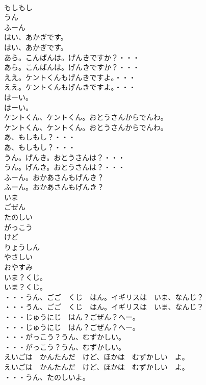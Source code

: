 \documentclass[8pt]{extreport}
\begin{document}
\begin{CJK}{UTF8}{min}
\\	もしもし
\\	うん
\\	ふーん
\\	はい、あかぎです。	
\\	はい、あかぎです。 
\\	あら。こんばんは。げんきですか？・・・	
\\	あら。こんばんは。げんきですか？・・・ 
\\	ええ。ケントくんもげんきですよ。・・・	
\\	ええ。ケントくんもげんきですよ。・・・ 
\\	はーい。	
\\	はーい。 
\\	ケントくん、ケントくん。おとうさんからでんわ。	
\\	ケントくん、ケントくん。おとうさんからでんわ。 
\\	あ、もしもし？・・・	
\\	あ、もしもし？・・・ 
\\	うん。げんき。おとうさんは？・・・	
\\	うん。げんき。おとうさんは？・・・ 
\\	ふーん。おかあさんもげんき？	
\\	ふーん。おかあさんもげんき？ 
\\	いま
\\	ごぜん
\\	たのしい
\\	がっこう
\\	けど
\\	りょうしん
\\	やさしい
\\	おやすみ
\\	いま？くじ。	
\\	いま？くじ。 
\\	・・・うん、ごご　くじ　はん。イギリスは　いま、なんじ？	
\\	・・・うん、ごご　くじ　はん。イギリスは　いま、なんじ？ 
\\	・・・じゅうにじ　はん？ごぜん？へー。	
\\	・・・じゅうにじ　はん？ごぜん？へー。 
\\	・・・がっこう？うん、むずかしい。	
\\	・・・がっこう？うん、むずかしい。 
\\	えいごは　かんたんだ　けど、ほかは　むずかしい　よ。	
\\	えいごは　かんたんだ　けど、ほかは　むずかしい　よ。 
\\	・・・うん、たのしいよ。	

\end{CJK}
\end{document}
